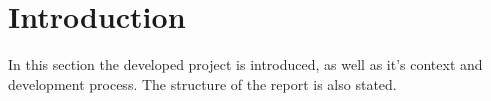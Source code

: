 
\section{Introduction}

In this section the developed project is introduced, as well as it's context and development process. The structure of the report is also stated. 






